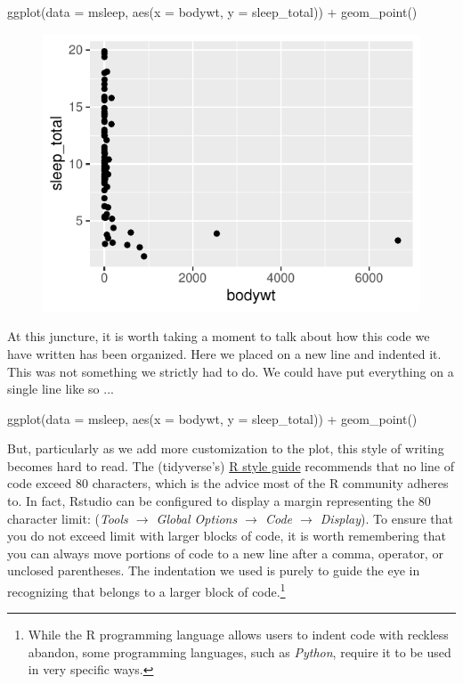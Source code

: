 \begin{inR}
ggplot(data = msleep, aes(x = bodywt, y = sleep_total)) +
  geom_point()
\end{inR}

\vspace{2em}

\begin{figure}[H]
\includegraphics[scale = 0.75]{graphics/ch2Figs/ggEx_2.pdf}
\label{fig:ggEx_2.pdf}
\end{figure}

\noindent
At this juncture, it is worth taking a moment to talk about how this code we have written has been organized. Here we placed  on a new line and indented it.  This was not something we strictly had to do.  We could have put everything on a single line like so ...

\begin{inR}
ggplot(data = msleep, aes(x = bodywt, y = sleep_total)) + geom_point()
\end{inR}

\vspace{1em}

\noindent
But, particularly as we add more customization to the plot, this style of writing becomes hard to read. The (tidyverse's) \href{https://style.tidyverse.org/syntax.html#long-lines}{R style guide} recommends that no line of code exceed 80 characters, which is the advice most of the R community adheres to. In fact, Rstudio can be configured to display a margin representing the 80 character limit: (\textit{Tools $\rightarrow$ Global Options $\rightarrow$ Code $\rightarrow$ Display}). To ensure that you do not exceed limit with larger blocks of code, it is worth remembering that you can always move portions of code to a new line after a comma, operator, or unclosed parentheses. The indentation we used is purely to guide the eye in recognizing that  belongs to a larger block of code.\footnote{While the R programming language allows users to indent code with reckless abandon, some programming languages, such as \textit{Python}, require it to be used in very specific ways.}

